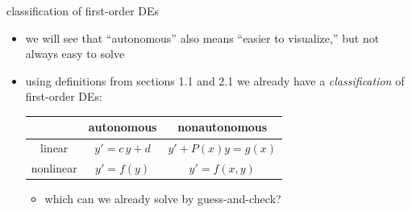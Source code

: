 \documentclass[colorlinks]{beamer}
\begin{document}
\begin{frame}{classification of first-order DEs}

\begin{itemize}
\item we will see that ``autonomous'' also means ``easier to visualize,'' but not always easy to solve
\item using definitions from sections 1.1 and 2.1 we already have a \emph{classification} of first-order DEs:

\medskip
\begin{center}
\begin{tabular}{c|c|c}
 & autonomous & nonautonomous \\ \hline
linear \Large\strut & $y' = c\, y + d$ & $y' + P(x) y = g(x)$ \\ \hline
nonlinear \Large\strut & $y' = f(y)$ & $y'=f(x,y)$
\end{tabular}
\end{center}

\medskip
    \begin{itemize}
    \item which can we already solve by guess-and-check?
    \end{itemize}
\end{itemize}

\vspace{20mm}
\end{frame}
\end{document}

